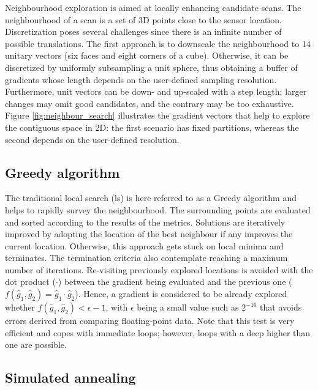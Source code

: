 Neighbourhood exploration is aimed at locally enhancing candidate scans. The neighbourhood of a scan is a set of 3D points close to the sensor location. Discretization poses several challenges since there is an infinite number of possible translations. The first approach is to downscale the neighbourhood to 14 unitary vectors (six faces and eight corners of a cube). Otherwise, it can be discretized by uniformly subsampling a unit sphere, thus obtaining a buffer of gradients whose length depends on the user-defined sampling resolution. Furthermore, unit vectors can be down- and up-scaled with a step length: larger changes may omit good candidates, and the contrary may be too exhaustive. Figure \ref{fig:neighbour_search} illustrates the gradient vectors that help to explore the contiguous space in 2D: the first scenario has fixed partitions, whereas the second depends on the user-defined resolution.

\subsection{Greedy algorithm}

The traditional local search (\acrshort{ls}) is here referred to as a Greedy algorithm and helps to rapidly survey the neighbourhood. The surrounding points are evaluated and sorted according to the results of the metrics. Solutions are iteratively improved by adopting the location of the best neighbour if any improves the current location. Otherwise, this approach gets stuck on local minima and terminates. The termination criteria also contemplate reaching a maximum number of iterations. Re-visiting previously explored locations is avoided with the dot product ($\cdot$) between the gradient being evaluated and the previous one ($f(\hat{g}_1, \hat{g}_2) = \hat{g}_1 \cdot \hat{g}_2$). Hence, a gradient is considered to be already explored whether $f(\hat{g}_1, \hat{g}_2) < \epsilon - 1$, with $\epsilon$ being a small value such as $2^{-16}$ that avoids errors derived from comparing floating-point data. Note that this test is very efficient and copes with immediate loops; however, loops with a deep higher than one are possible.

\subsection{Simulated annealing}

